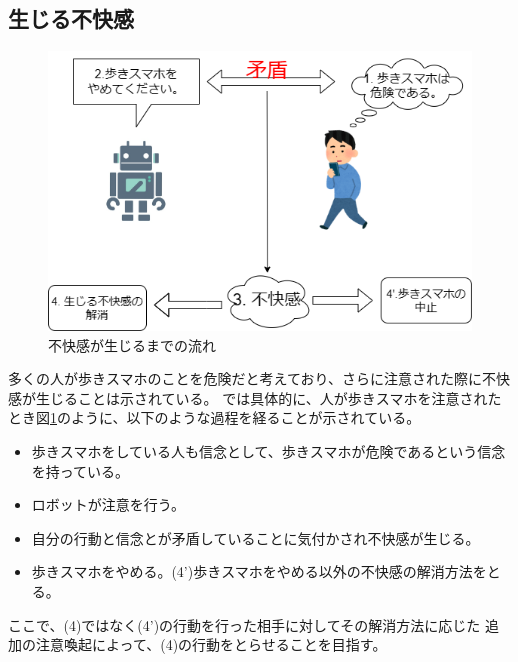 \documentclass{kuisthesis}
\begin{document}
\subsection{生じる不快感}
\label{sec: dissonance}
\begin{figure}[htbp]
  
  \includegraphics[width=13cm]{img/CDT.png}
  \caption{不快感が生じるまでの流れ}
  \label{fig: dissonance}
\end{figure}

多くの人が歩きスマホのことを危険だと考えており、さらに注意された際に不快感が生じることは示されている。
\cite{Schneider2022}では具体的に、人が歩きスマホを注意されたとき図\ref{fig: dissonance}のように、以下のような過程を経ることが示されている。
\begin{itemize}
  \item[(1)] 歩きスマホをしている人も信念として、歩きスマホが危険であるという信念を持っている。
  \item[(2)] ロボットが注意を行う。
  \item[(3)] 自分の行動と信念とが矛盾していることに気付かされ不快感が生じる。
  \item[(4)] 歩きスマホをやめる。(4')歩きスマホをやめる以外の不快感の解消方法をとる。
  \label{item: dissonance}
\end{itemize}
ここで、(4)ではなく(4')の行動を行った相手に対してその解消方法に応じた
追加の注意喚起によって、(4)の行動をとらせることを目指す。
\end{document}
